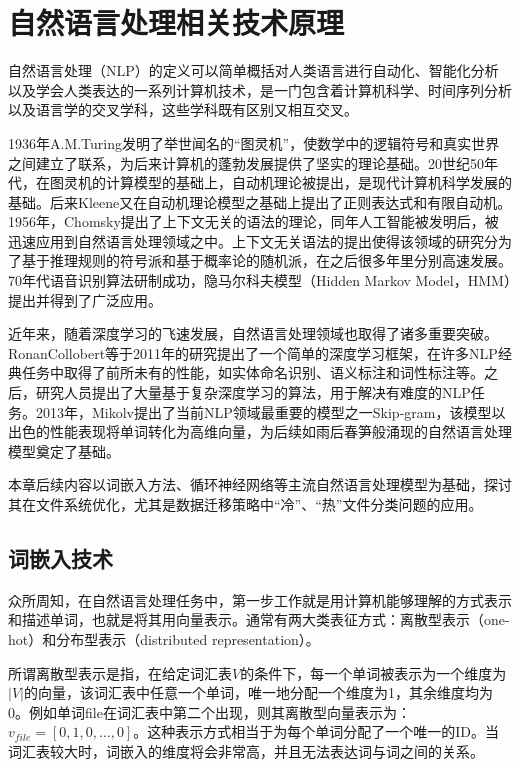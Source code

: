 \chapter{自然语言处理相关技术原理}
自然语言处理（NLP）的定义可以简单概括对人类语言进行自动化、智能化分析以及学会人类表达的一系列计算机技术，是一门包含着计算机科学、时间序列分析以及语言学的交叉学科，这些学科既有区别又相互交叉。

1936年A.M.Turing发明了举世闻名的“图灵机”，使数学中的逻辑符号和真实世界之间建立了联系，为后来计算机的蓬勃发展提供了坚实的理论基础。20世纪50年代，在图灵机的计算模型的基础上，自动机理论被提出，是现代计算机科学发展的基础\cite{自然语言处理的历史与现状}。后来Kleene又在自动机理论模型之基础上提出了正则表达式和有限自动机。1956年，Chomsky提出了上下文无关的语法的理论，同年人工智能被发明后，被迅速应用到自然语言处理领域之中。上下文无关语法的提出使得该领域的研究分为了基于推理规则的符号派和基于概率论的随机派\cite{宋一凡2019自然语言处理的发展历史与现状}，在之后很多年里分别高速发展。70年代语音识别算法研制成功，隐马尔科夫模型（Hidden Markov Model，HMM）提出并得到了广泛应用\cite{自然语言处理的历史与现状}。

近年来，随着深度学习的飞速发展，自然语言处理领域也取得了诸多重要突破。RonanCollobert等\cite{Natural_language_processing_(almost)_from_scratch}于2011年的研究提出了一个简单的深度学习框架，在许多NLP经典任务中取得了前所未有的性能，如实体命名识别、语义标注和词性标注等。之后，研究人员提出了大量基于复杂深度学习的算法，用于解决有难度的NLP任务。2013年，Mikolv\cite{skipgram}提出了当前NLP领域最重要的模型之一Skip-gram，该模型以出色的性能表现将单词转化为高维向量，为后续如雨后春笋般涌现的自然语言处理模型奠定了基础。

本章后续内容以词嵌入方法、循环神经网络等主流自然语言处理模型为基础，探讨其在文件系统优化，尤其是数据迁移策略中“冷”、“热”文件分类问题的应用。

\section{词嵌入技术}


众所周知，在自然语言处理任务中，第一步工作就是用计算机能够理解的方式表示和描述单词，也就是将其用向量表示。通常有两大类表征方式：离散型表示（one-hot）和分布型表示（distributed representation）。

所谓离散型表示是指，在给定词汇表$V$的条件下，每一个单词被表示为一个维度为$|V|$的向量，该词汇表中任意一个单词，唯一地分配一个维度为1，其余维度均为0。例如单词file在词汇表中第二个出现，则其离散型向量表示为：$v_{file} = [0,1,0,\dots,0]$。这种表示方式相当于为每个单词分配了一个唯一的ID。当词汇表较大时，词嵌入的维度将会非常高，并且无法表达词与词之间的关系。

